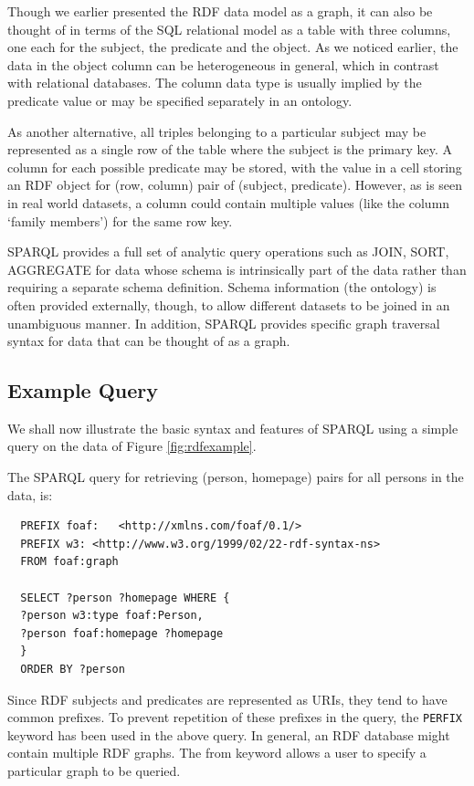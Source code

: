 \documentclass[a4paper, twoside, 12pt]{report}
\begin{document}
Though we earlier presented the RDF data model as a graph, it can also be thought of in terms of the SQL relational model as a table with three columns, one each for the subject, the predicate and the object. As we noticed earlier, the data in the object column can be heterogeneous in general, which in contrast with relational databases. The column data type is usually implied by the predicate value or may be specified separately in an ontology. 

As another alternative, all triples belonging to a particular subject may be represented as a single row of the table where the subject is the primary key. A column for each possible predicate may be stored, with the value in a cell storing an RDF object for (row, column) pair of (subject, predicate). However, as is seen in real world datasets, a column could contain multiple values (like the column `family members') for the same row key.

SPARQL provides a full set of analytic query operations such as JOIN, SORT, AGGREGATE for data whose schema is intrinsically part of the data rather than requiring a separate schema definition. Schema information (the ontology) is often provided externally, though, to allow different datasets to be joined in an unambiguous manner. In addition, SPARQL provides specific graph traversal syntax for data that can be thought of as a graph.

\subsection{Example Query}

We shall now illustrate the basic syntax and features of SPARQL using a simple query on the data of Figure \ref{fig:rdfexample}. 

The SPARQL query for retrieving (person, homepage) pairs for all persons in the data, is:
\begin{verbatim}
  PREFIX foaf:   <http://xmlns.com/foaf/0.1/>
  PREFIX w3: <http://www.w3.org/1999/02/22-rdf-syntax-ns>
  FROM foaf:graph
  
  SELECT ?person ?homepage WHERE {
  ?person w3:type foaf:Person,
  ?person foaf:homepage ?homepage
  }
  ORDER BY ?person
\end{verbatim}

Since RDF subjects and predicates are represented as URIs, they tend to have common prefixes. To prevent repetition of these prefixes in the query, the \verb|PERFIX| keyword has been used in the above query. In general, an RDF database might contain multiple RDF graphs. The from keyword allows a user to specify a particular graph to be queried.
\end{document}
